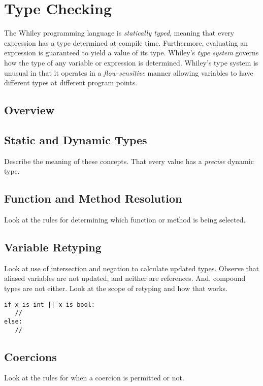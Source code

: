 \chapter{Type Checking}
The Whiley programming language is {\em statically typed}, meaning that every expression has a type determined at compile time.  Furthermore, evaluating an expression is guaranteed to yield a value of its type.  Whiley's {\em type system} governs how the type of any variable or expression is determined.  Whiley's type system is unusual in that it operates in a {\em flow-sensitive} manner allowing variables to have different types at different program points.


\section{Overview}


\section{Static and Dynamic Types}

Describe the meaning of these concepts.  That every value has a {\em precise} dynamic type.  

\section{Function and Method Resolution}
Look at the rules for determining which function or method is being selected.

\section{Variable Retyping}

Look at use of intersection and negation to calculate updated types.  Observe that aliased variables are not updated, and neither are references.  And, compound types are not either.  Look at the scope of retyping and how that works.

\begin{lstlisting}
if x is int || x is bool:
   //
else:
   //
\end{lstlisting}

\section{Coercions}
Look at the rules for when a coercion is permitted or not.